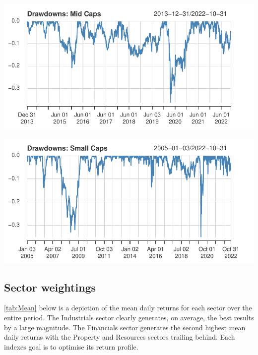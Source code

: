 \documentclass[11pt,preprint, authoryear]{elsarticle}
\let\origfigure\figure
\let\endorigfigure\endfigure
\renewenvironment{figure}[1][2] {
    \expandafter\origfigure\expandafter[H]
} {
    \endorigfigure
}
\numberwithin{equation}{section}
\numberwithin{figure}{section}
\numberwithin{table}{section}
\begin{document}
\begin{figure}[H]

{\centering \includegraphics{Volatility-of-Shares_files/figure-latex/Figure2-1} 

}

\caption{Mid Cap drawdown chart \label{Figure2}}\label{fig:Figure2}
\end{figure}

\begin{figure}[H]

{\centering \includegraphics{Volatility-of-Shares_files/figure-latex/Figure3-1} 

}

\caption{Small Cap drawdown chart \label{Figure3}}\label{fig:Figure3}
\end{figure}

\hypertarget{sector-weightings}{%
\subsection{Sector weightings}\label{sector-weightings}}

\ref{tab:Mean} below is a depiction of the mean daily returns for each
sector over the entire period. The Industrials sector clearly generates,
on average, the best results by a large magnitude. The Financials sector
generates the second highest mean daily returns with the Property and
Resources sectors trailing behind. Each indexes goal is to optimise its
return profile.
\end{document}
